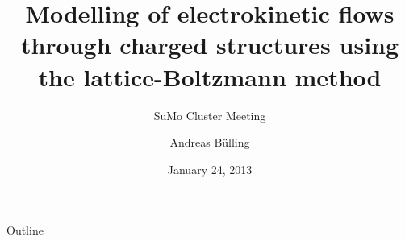 \documentclass[10pt]{beamer} %
\title{Modelling of electrokinetic flows through charged structures
  using the lattice-Boltzmann method}
\subtitle{SuMo Cluster Meeting} %
\author[A. B\"ulling]{Andreas B\"ulling} %
\institute{Chalmers University of Technology}
\date{January 24, 2013}
\begin{document}
\begin{frame}[plain]
  \titlepage
\end{frame}

\begin{frame}{Outline}
  \tableofcontents[pausesections]
\end{frame}








\end{document}
